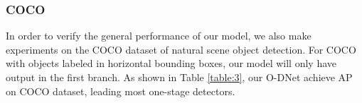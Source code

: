 \documentclass[runningheads]{llncs}
\begin{document}
\begin{table}[!h]
\centering
{}
\vspace{10pt}
\caption{Comparison with different methods on the ICDAR2015 dataset. Our model achieve  F1, better than other models in this table.}
\label{table:2}
\end{table}


\subsubsection{COCO}

In order to verify the general performance of our model, we also make experiments on the COCO dataset of natural scene object detection. For COCO with objects labeled in horizontal bounding boxes, our model will only have output in the first branch. As shown in Table \ref{table:3}, our O-DNet achieve  AP on COCO dataset, leading most one-stage detectors. 
\end{document}
